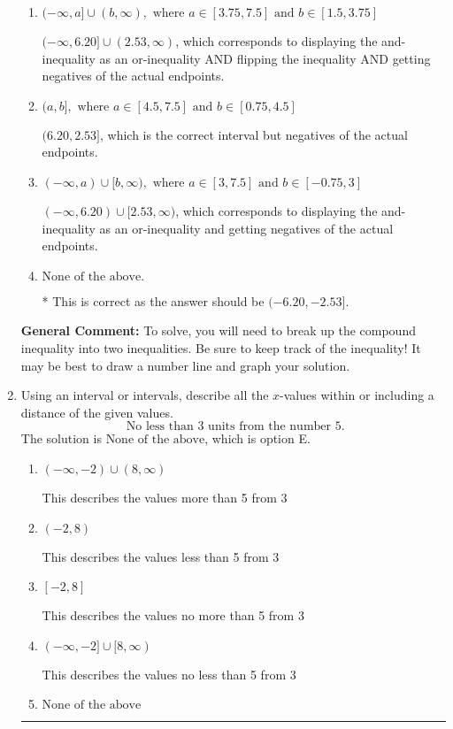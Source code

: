 \documentclass{extbook}[14pt]
\newcommand{\litem}[1]{\item #1

\rule{\textwidth}{0.4pt}}
\begin{document}
\begin{enumerate}
{\begin{enumerate}[label=\Alph*.]
$[6.20, 2.53)$, which corresponds to flipping the inequality and getting negatives of the actual endpoints.
\item \( (-\infty, a] \cup (b, \infty), \text{ where } a \in [3.75, 7.5] \text{ and } b \in [1.5, 3.75] \)

$(-\infty, 6.20] \cup (2.53, \infty)$, which corresponds to displaying the and-inequality as an or-inequality AND flipping the inequality AND getting negatives of the actual endpoints.
\item \( (a, b], \text{ where } a \in [4.5, 7.5] \text{ and } b \in [0.75, 4.5] \)

$(6.20, 2.53]$, which is the correct interval but negatives of the actual endpoints.
\item \( (-\infty, a) \cup [b, \infty), \text{ where } a \in [3, 7.5] \text{ and } b \in [-0.75, 3] \)

$(-\infty, 6.20) \cup [2.53, \infty)$, which corresponds to displaying the and-inequality as an or-inequality and getting negatives of the actual endpoints.
\item \( \text{None of the above.} \)

* This is correct as the answer should be $(-6.20, -2.53]$.
\end{enumerate}

\textbf{General Comment:} To solve, you will need to break up the compound inequality into two inequalities. Be sure to keep track of the inequality! It may be best to draw a number line and graph your solution.
}
\litem{
Using an interval or intervals, describe all the $x$-values within or including a distance of the given values.
\[ \text{ No less than } 3 \text{ units from the number } 5. \]The solution is \( \text{None of the above} \), which is option E.\begin{enumerate}[label=\Alph*.]
\item \( (-\infty, -2) \cup (8, \infty) \)

This describes the values more than 5 from 3
\item \( (-2, 8) \)

This describes the values less than 5 from 3
\item \( [-2, 8] \)

This describes the values no more than 5 from 3
\item \( (-\infty, -2] \cup [8, \infty) \)

This describes the values no less than 5 from 3
\item \( \text{None of the above} \)


\end{enumerate}}
\end{enumerate}
\end{document}
